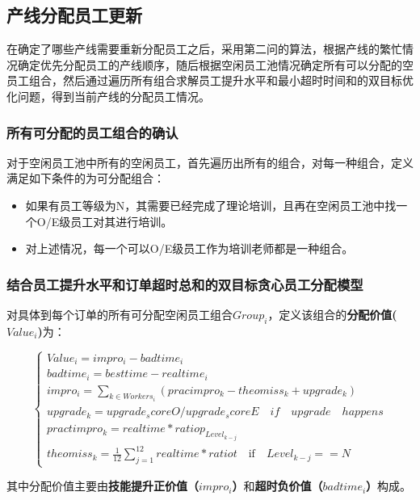 \subsection{产线分配员工更新}

在确定了哪些产线需要重新分配员工之后，采用第二问的算法，根据产线的繁忙情况确定优先分配员工的产线顺序，随后根据空闲员工池情况确定所有可以分配的空员工组合，然后通过遍历所有组合求解员工提升水平和最小超时时间和的双目标优化问题，得到当前产线的分配员工情况。

\subsubsection{所有可分配的员工组合的确认}

对于空闲员工池中所有的空闲员工，首先遍历出所有的组合，对每一种组合，定义满足如下条件的为可分配组合：

\begin{itemize}[left=1em]
    \item 如果有员工等级为N，其需要已经完成了理论培训，且再在空闲员工池中找一个O/E级员工对其进行培训。
    \item 对上述情况，每一个可以O/E级员工作为培训老师都是一种组合。
\end{itemize}



\subsubsection{结合员工提升水平和订单超时总和的双目标贪心员工分配模型}

对具体到每个订单的所有可分配空闲员工组合$Group_i$，定义该组合的\textbf{分配价值($Value_i$)}为：

\[
    \begin{cases}
      Value_i = impro_i  - badtime_i \\
       badtime_i = besttime - realtime_i \\
       impro_i = \sum_{k \in Workers_i} (pracimpro_k  - theomiss_k  + upgrade_k  )\\ 
       upgrade_k = upgrade_scoreO / upgrade_scoreE \quad if \quad upgrade \quad happens \\
       practimpro_k =  realtime * ratiop_{Level_{k-j}}\\
       theomiss_k = \frac{1}{12} \sum_{j=1}^{12} realtime * ratiot\quad \text{if} \quad Level_{k-j} == N 
    \end{cases}
\]

其中分配价值主要由\textbf{技能提升正价值（$impro_i$）}和\textbf{超时负价值（$badtime_i$）}构成。

